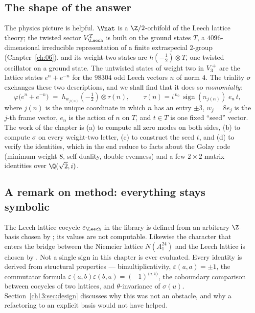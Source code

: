 \subsection*{The shape of the answer}
The physics picture is helpful. $\Vnat$ is a $\Z/2$-orbifold of the Leech lattice theory; the
twisted sector $V_\Leech^T$ is built on the ground states $T$, a $4096$-dimensional irreducible
representation of a finite extraspecial $2$-group (Chapter~\ref{ch:06}), and its weight-two states
are $h(-\tfrac12)\otimes T$, one twisted oscillator on a ground state. The untwisted states of
weight two in $V_3^{+}$ are the lattice states $e^{n}+e^{-n}$ for the $98304$ odd Leech vectors $n$
of norm $4$. The triality $\sigma$ exchanges these two descriptions, and we shall find that it does
so \emph{monomially}:
\begin{equation*}
  \varphi\bigl(e^{n}+e^{-n}\bigr) \;=\; h_{w_{j(n)}}(-\tfrac12)\otimes \tau(n),
  \qquad \tau(n)=i^{\,n_0}\,\operatorname{sign}(n_{j(n)})\;e_{n}\,t ,
\end{equation*}
where $j(n)$ is the unique coordinate in which $n$ has an entry $\pm3$, $w_j=8e_j$ is the $j$-th frame
vector, $e_n$ is the action of $n$ on $T$, and $t\in T$ is one fixed ``seed'' vector. The work of the
chapter is (a) to compute all zero modes on both sides, (b) to compute $\sigma$ on every weight-two
letter, (c) to construct the seed $t$, and (d) to verify the identities, which in the end reduce to
facts about the Golay code (minimum weight $8$, self-duality, double evenness) and a few
$2\times2$ matrix identities over $\Q(\sqrt2, i)$.

\subsection*{A remark on method: everything stays symbolic}
The Leech lattice cocycle $\varepsilon_\Leech$ in the library is defined from an arbitrary
$\Z$-basis chosen by ; its values are not computable. Likewise the
character  that enters the bridge between the Niemeier lattice $N(A_1^{24})$ and the
Leech lattice is chosen by . Not a single sign in this chapter is ever
evaluated. Every identity is derived from structural properties --- bimultiplicativity,
$\varepsilon(a,a)=\pm1$, the commutator formula $\varepsilon(a,b)\varepsilon(b,a)=(-1)^{\langle
a,b\rangle}$, the coboundary comparison between cocycles of two lattices, and $\theta$-invariance of
$\sigma(u)$. Section~\ref{ch13:sec:design} discusses why this was not an obstacle, and why a
refactoring to an explicit basis would not have helped.

